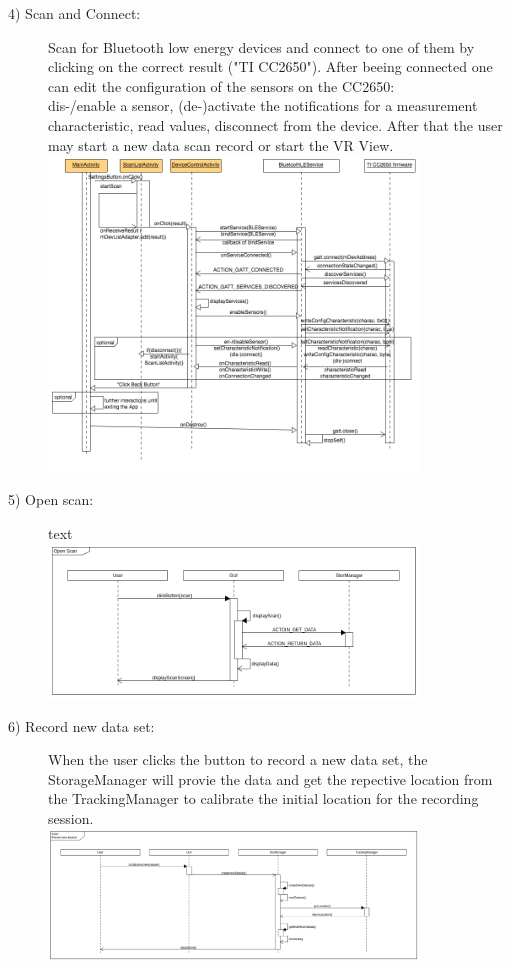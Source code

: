 \begin{description}
	\item[4) Scan and Connect:] Scan for Bluetooth low energy devices and connect to one of them by clicking on the correct result ("TI CC2650").
	After beeing connected one can edit the configuration of the sensors on the CC2650: \\dis-/enable a sensor, (de-)activate the notifications for a measurement characteristic, read values, disconnect from the device. After that the user may start a new data scan record or start the VR View.\\
	\includegraphics[width=0.8\textwidth]{diagramms/bleseq.png}

	\item[5) Open scan: ] text \\
	\includegraphics[width=0.8\textwidth]{diagramms/scan.png}

	\item[6) Record new data set: ] When the user clicks the button to record a new data set, the StorageManager will provie the data and get the repective location from the TrackingManager to calibrate the initial location for the recording session. \\
	\includegraphics[width=0.8\textwidth]{diagramms/newDataset.png}


\end{description}
